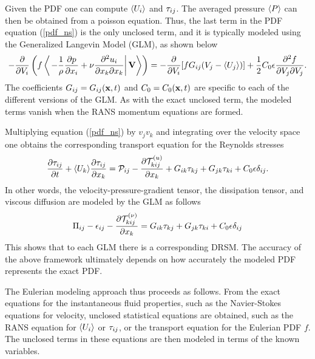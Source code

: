 \documentclass[oneside,a4paper,11pt]{report}
\begin{document}
Given the PDF one can compute $\langle U_i \rangle$ and $\tau_{ij}$. The averaged pressure $\langle P \rangle$ can then be obtained from a poisson equation. Thus, the last term in the PDF equation (\ref{pdf_ns}) is the only unclosed term, and it is typically modeled using the Generalized Langevin Model (GLM), as shown below
\begin{equation}
\label{GLM}
- \frac{\partial}{\partial V_i} \left ( f \left < \left . - \frac{1}{\rho} \frac{\partial p}{\partial x_i} +  \nu \frac{\partial^2 u_i}{\partial x_k \partial x_k} \right | \mathbf{V} \right > \right ) = -\frac{\partial}{\partial V_i} [f G_{ij} (V_j - \langle U_j \rangle)] + \frac{1}{2} C_0 \epsilon \frac{\partial^2 f}{\partial V_j \partial V_j}.
\end{equation}
The coefficients $G_{ij} = G_{ij}(\mathbf{x},t)$ and $C_0 = C_0(\mathbf{x},t)$ are specific to each of the different versions of the GLM. As with the exact unclosed term, the modeled terms vanish when the RANS momentum equations are formed. 

Multiplying equation (\ref{pdf_ns}) by $v_j v_k$ and integrating over the velocity space one obtains the corresponding transport equation for the Reynolds stresses
\begin{equation}
\frac{\partial \tau_{ij}}{\partial t} + \langle U_k \rangle \frac{\partial \tau_{ij}}{\partial x_k} = \mathcal{P}_{ij} - \frac{\partial \mathcal{T}^{(u)}_{kij} }{\partial x_k} + G_{ik} \tau_{kj} + G_{jk} \tau_{ki} + C_0 \epsilon \delta_{ij}.
\end{equation} 
In other words, the velocity-pressure-gradient tensor, the dissipation tensor, and viscous diffusion are modeled by the GLM as follows
\begin{equation}
\Pi_{ij} - \epsilon_{ij} - \frac{\partial \mathcal{T}^{(\nu)}_{kij} }{\partial x_k} = G_{ik} \tau_{kj} + G_{jk} \tau_{ki} + C_0 \epsilon \delta_{ij}
\end{equation}
This shows that to each GLM there is a corresponding DRSM. The accuracy of the above framework ultimately depends on how accurately the modeled PDF represents the exact PDF.

The Eulerian modeling approach thus proceeds as follows. From the exact equations for the instantaneous fluid properties, such as the Navier-Stokes equations for velocity, unclosed statistical equations are obtained, such as the RANS equation for $\langle U_i \rangle$ or $\tau_{ij}$, or the transport equation for the Eulerian PDF $f$. The unclosed terms in these equations are then modeled in terms of the known variables.

\end{document}
